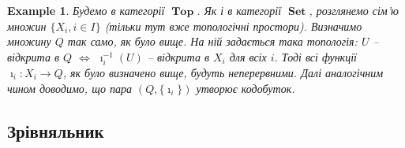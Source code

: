 \documentclass[a4paper, 10pt]{article}
\theoremstyle{theoremdd}
\newtheorem{example}[theorem]{Example}
\DeclareMathOperator{\Set}{\textbf{Set}}
\DeclareMathOperator{\Top}{\textbf{Top}}
\begin{document}
\begin{example}
Будемо в категорії $\Top$. Як і в категорії $\Set$, розглянемо сім'ю множин $\{X_i, i \in I\}$ (тільки тут вже топологічні простори). Визначимо множину $Q$ так само, як було вище. На ній задається така топологія: $U$ -- відкрита в $Q$ $\iff$ $\imath_i^{-1}(U)$ -- відкрита в $X_i$ для всіх $i$. Тоді всі функції $\imath_i \colon X_i \to Q$, як було визначено вище, будуть неперервними. Далі аналогічним чином доводимо, що пара $(Q,\{\imath_i\})$ утворює кодобуток.
\end{example}


\subsection{Зрівняльник}
\end{document}
